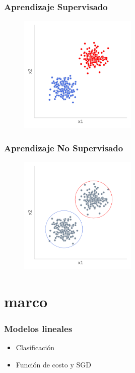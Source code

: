 \documentclass{beamer}
\begin{document}
\begin{frame}
\frametitle{Aprendizaje Supervisado}
\begin{figure}
    \centering
    \includegraphics[width=0.5\textwidth]{images/machinelearning1.pdf}
\end{figure}
\end{frame}





\begin{frame}
\frametitle{Aprendizaje No Supervisado}
\begin{figure}
    \centering
    \includegraphics[width=0.5\textwidth]{images/machinelearning2.pdf}
\end{figure}
\end{frame}





\section{marco}
\begin{frame}
\frametitle{Modelos lineales}
\begin{itemize}
    \item Clasificación
    \item Función de costo y SGD 
\end{itemize}
\end{frame}
\end{document}
